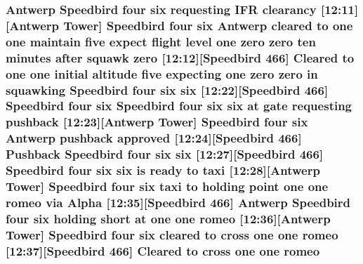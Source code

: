 \subsubsection[{\texorpdfstring{romeo}{romeo}}]{\setlength{\rightskip}{0pt plus 5cm}Antwerp Speedbird four {\bf six} requesting I\+FR clearancy \mbox{[}12\+:11\mbox{]}\mbox{[}Antwerp {\bf Tower}\mbox{]} Speedbird four {\bf six} Antwerp cleared to {\bf one} {\bf one} maintain five expect flight level {\bf one} {\bf zero} {\bf zero} {\bf ten} minutes after squawk {\bf zero} \mbox{[}12\+:12\mbox{]}\mbox{[}Speedbird 466\mbox{]} Cleared to {\bf one} {\bf one} initial altitude five expecting {\bf one} {\bf zero} {\bf zero} in {\bf squawking} Speedbird four {\bf six} {\bf six} \mbox{[}12\+:22\mbox{]}\mbox{[}Speedbird 466\mbox{]} Speedbird four {\bf six} Speedbird four {\bf six} {\bf six} at gate requesting pushback \mbox{[}12\+:23\mbox{]}\mbox{[}Antwerp {\bf Tower}\mbox{]} Speedbird four {\bf six} Antwerp pushback {\bf approved} \mbox{[}12\+:24\mbox{]}\mbox{[}Speedbird 466\mbox{]} Pushback Speedbird four {\bf six} {\bf six} \mbox{[}12\+:27\mbox{]}\mbox{[}Speedbird 466\mbox{]} Speedbird four {\bf six} {\bf six} is ready to taxi \mbox{[}12\+:28\mbox{]}\mbox{[}Antwerp {\bf Tower}\mbox{]} Speedbird four {\bf six} taxi to holding point {\bf one} {\bf one} romeo via {\bf Alpha} \mbox{[}12\+:35\mbox{]}\mbox{[}Speedbird 466\mbox{]} Antwerp Speedbird four {\bf six} holding short at {\bf one} {\bf one} romeo \mbox{[}12\+:36\mbox{]}\mbox{[}Antwerp {\bf Tower}\mbox{]} Speedbird four {\bf six} cleared to cross {\bf one} {\bf one} romeo \mbox{[}12\+:37\mbox{]}\mbox{[}Speedbird 466\mbox{]} Cleared to cross {\bf one} {\bf one} romeo}\hypertarget{happyDay4ExpectedATC_8txt_a675cfa5c76a2ab697663f72c9d4e8c9a}{}\label{happyDay4ExpectedATC_8txt_a675cfa5c76a2ab697663f72c9d4e8c9a}
